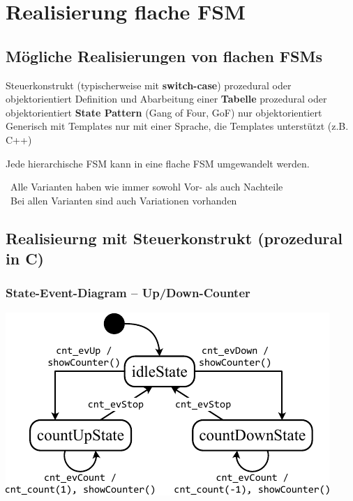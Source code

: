 \section{Realisierung flache FSM}

\subsection{Mögliche Realisierungen von flachen FSMs}

\begin{outline}
    \1 Steuerkonstrukt (typischerweise mit \textbf{switch-case})
        \2 prozedural oder objektorientiert
    \1 Definition und Abarbeitung einer \textbf{Tabelle}
        \2 prozedural oder objektorientiert
    \1 \textbf{State Pattern} (Gang of Four, GoF)
        \2 nur objektorientiert
    \1 Generisch mit Templates
        \2 nur mit einer Sprache, die Templates unterstützt (z.B. C++)
\end{outline}

\vspace{0.2cm}

Jede hierarchische FSM kann in eine flache FSM umgewandelt werden.
\vspace{0.1cm}

\textrightarrow\ Alle Varianten haben wie immer sowohl Vor- als auch Nachteile \\
\textrightarrow\ Bei allen Varianten sind auch Variationen vorhanden


\subsection{Realisieurng mit Steuerkonstrukt (prozedural in C)}

\subsubsection{State-Event-Diagram -- Up/Down-Counter}

\begin{center}
    \includegraphics[width=0.8\columnwidth]{images/fsm_up-down-counter_diagramm_C.pdf}
\end{center}


